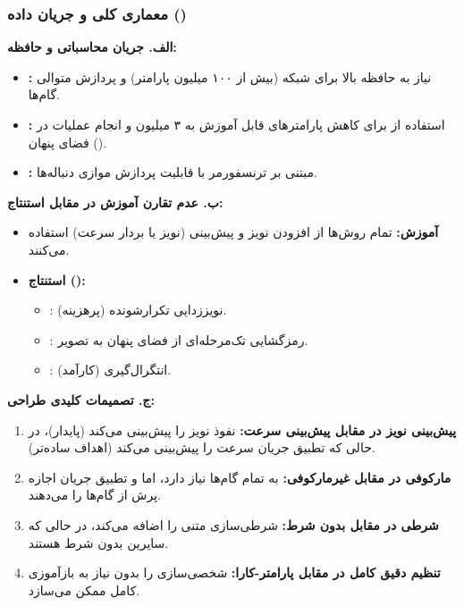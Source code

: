 \subsubsection{معماری کلی و جریان داده ()}

\textbf{الف. جریان محاسباتی و حافظه:}
\begin{itemize}
    \item \textbf{:} نیاز به حافظه بالا برای شبکه  (بیش از ۱۰۰ میلیون پارامتر) و پردازش متوالی گام‌ها.
    \item \textbf{:} استفاده از  برای کاهش پارامترهای قابل آموزش به ۳ میلیون و انجام عملیات در فضای پنهان ().
    \item \textbf{:} مبتنی بر ترنسفورمر با قابلیت پردازش موازی دنباله‌ها.
\end{itemize}



\textbf{ب. عدم تقارن آموزش در مقابل استنتاج:}
\begin{itemize}
    \item \textbf{آموزش:} تمام روش‌ها از افزودن نویز و پیش‌بینی (نویز یا بردار سرعت) استفاده می‌کنند.
    \item \textbf{استنتاج ():} 
    \begin{itemize}
        \item {}: نویززدایی تکرار‌شونده (پرهزینه).
        \item {}: رمزگشایی تک‌مرحله‌ای از فضای پنهان به تصویر.
        \item {}: انتگرال‌گیری  (کارآمد).
    \end{itemize}
\end{itemize}

\textbf{ج. تصمیمات کلیدی طراحی:}
\begin{enumerate}
    \item \textbf{پیش‌بینی نویز در مقابل پیش‌بینی سرعت:} نفوذ نویز را پیش‌بینی می‌کند (پایدار)، در حالی که تطبیق جریان سرعت را پیش‌بینی می‌کند (اهداف ساده‌تر).
    \item \textbf{مارکوفی در مقابل غیرمارکوفی:}  به تمام گام‌ها نیاز دارد، اما  و تطبیق جریان اجازه پرش از گام‌ها را می‌دهند.
    \item \textbf{شرطی در مقابل بدون شرط:}  شرطی‌سازی متنی را اضافه می‌کند، در حالی که سایرین بدون شرط هستند.
    \item \textbf{تنظیم دقیق کامل در مقابل پارامتر-کارا:}  شخصی‌سازی را بدون نیاز به بازآموزی کامل ممکن می‌سازد.
\end{enumerate}

